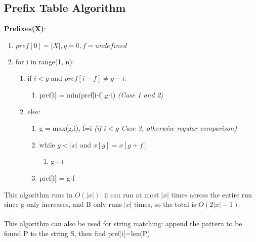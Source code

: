 \subsection{Prefix Table Algorithm}
\textbf{Prefixes(X)}:
\begin{enumerate}[label=\Alph*]
    \item \(pref[0]= |X|, g=0, f = undefined\)
    \item for i in range(1, n):
\begin{enumerate}[label=\arabic*]
    \item if $ i < g$ and $pref[i-f] \neq g-i $:
    \begin{enumerate}
        \item [] pref[i] = min(pref[i-f],g-i) \emph{(Case 1 and 2)}
    \end{enumerate}    
    \item else:
    \begin{enumerate}
        \item g = max(g,i),   f=i \emph{(if $i < g$ Case 3, otherwise regular comparison)}
        \item while \( g < |x| \) and \( x[g] = x[g+f]\)
        \begin{enumerate}
            \item [] g++ 
        \end{enumerate}   
        \item pref[i] = g-f
    \end{enumerate}  
\end{enumerate}    
\end{enumerate}
This algorithm runs in $O(|x|)$: ii can run at most $|x|$ times across the entire run since g only increases, and B only runs $|x|$ times, so the total is $O(2|x|-1)$. \\ \\
This algorithm can also be used for string matching: append the pattern to be found P to the string S, then find pref[i]=len(P).

